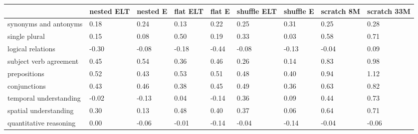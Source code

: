 \documentclass[a4paper, 11pt, oneside]{article}
\begin{document}
	\begin{table}[ht]
		\centering
		\begin{tabular}{|p{90pt}|*{8}{p{33pt}|}}
			\hline
			                        & \textbf{nested ELT} & \textbf{nested E} & \textbf{flat ELT} & \textbf{flat E} & \textbf{shuffle ELT} & \textbf{shuffle E} & \textbf{scratch 8M} & \textbf{scratch 33M} \\
			\hline
			synonyms and antonyms   & 0.18                & 0.24              & 0.13              & 0.22            & 0.25                 & 0.31               & 0.25                & 0.28                 \\
			\hline
			single plural           & 0.15                & 0.08              & 0.50              & 0.19            & 0.33                 & 0.03               & 0.58                & 0.71                 \\
			\hline
			logical relations       & -0.30               & -0.08             & -0.18             & -0.44           & -0.08                & -0.13              & -0.04               & 0.09                 \\
			\hline
			subject verb agreement  & 0.45                & 0.54              & 0.36              & 0.46            & 0.26                 & 0.14               & 0.83                & 0.98                 \\
			\hline
			prepositions            & 0.52                & 0.43              & 0.53              & 0.51            & 0.48                 & 0.40               & 0.94                & 1.12                 \\
			\hline
			conjunctions            & 0.43                & 0.46              & 0.38              & 0.45            & 0.49                 & 0.36               & 0.63                & 0.82                 \\
			\hline
			temporal understanding  & -0.02               & -0.13             & 0.04              & -0.14           & 0.36                 & 0.09               & 0.44                & 0.73                 \\
			\hline
			spatial understanding   & 0.30                & 0.13              & 0.48              & 0.40            & 0.37                 & 0.06               & 0.64                & 0.71                 \\
			\hline
			quantitative reasoning  & 0.00                & -0.06             & -0.01             & -0.14           & -0.04                & -0.14              & -0.04               & -0.06                \\

\end{tabular}
\end{table}
\end{document}
